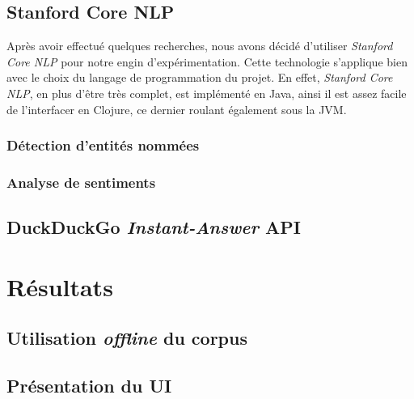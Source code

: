\documentclass[12pt]{article}
\begin{document}
\subsection{Stanford Core NLP}

Après avoir effectué quelques recherches, nous avons décidé d'utiliser \textit{Stanford Core NLP} pour notre engin d'expérimentation. Cette technologie s'applique bien avec le choix du langage de programmation du projet. En effet, \textit{Stanford Core NLP}, en plus d'être très complet, est implémenté en Java, ainsi il est assez facile de l'interfacer en Clojure, ce dernier roulant également sous la JVM.

\subsubsection{Détection d'entités nommées}
\subsubsection{Analyse de sentiments}

\subsection{DuckDuckGo \textit{Instant-Answer} API}



\section{Résultats}

\subsection{Utilisation \textit{offline} du corpus}
\subsection{Présentation du UI}

\end{document}
